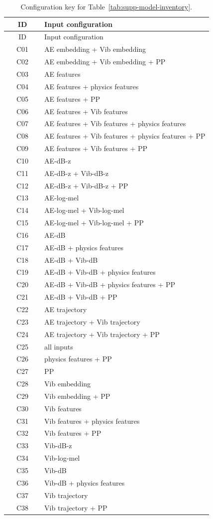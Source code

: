 \begin{longtable}{@{}cp{0.82\linewidth}@{}}
\caption{Configuration key for Table~\ref{tab:supp-model-inventory}.}\\
\toprule
ID & Input configuration \\
\midrule
\endfirsthead
\toprule
ID & Input configuration \\
\midrule
\endhead
C01 & AE embedding + Vib embedding \\
C02 & AE embedding + Vib embedding + PP \\
C03 & AE features \\
C04 & AE features + physics features \\
C05 & AE features + PP \\
C06 & AE features + Vib features \\
C07 & AE features + Vib features + physics features \\
C08 & AE features + Vib features + physics features + PP \\
C09 & AE features + Vib features + PP \\
C10 & AE-dB-z \\
C11 & AE-dB-z + Vib-dB-z \\
C12 & AE-dB-z + Vib-dB-z + PP \\
C13 & AE-log-mel \\
C14 & AE-log-mel + Vib-log-mel \\
C15 & AE-log-mel + Vib-log-mel + PP \\
C16 & AE-dB \\
C17 & AE-dB + physics features \\
C18 & AE-dB + Vib-dB \\
C19 & AE-dB + Vib-dB + physics features \\
C20 & AE-dB + Vib-dB + physics features + PP \\
C21 & AE-dB + Vib-dB + PP \\
C22 & AE trajectory \\
C23 & AE trajectory + Vib trajectory \\
C24 & AE trajectory + Vib trajectory + PP \\
C25 & all inputs \\
C26 & physics features + PP \\
C27 & PP \\
C28 & Vib embedding \\
C29 & Vib embedding + PP \\
C30 & Vib features \\
C31 & Vib features + physics features \\
C32 & Vib features + PP \\
C33 & Vib-dB-z \\
C34 & Vib-log-mel \\
C35 & Vib-dB \\
C36 & Vib-dB + physics features \\
C37 & Vib trajectory \\
C38 & Vib trajectory + PP \\
\bottomrule
\end{longtable}
